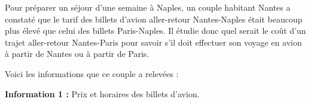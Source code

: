 
\medskip 

Pour préparer un séjour d'une semaine à Naples, un couple habitant Nantes a constaté que le tarif des billets d'avion aller-retour Nantes-Naples était beaucoup plus élevé que celui des billets Paris-Naples. Il étudie donc quel serait le coût d'un trajet aller-retour Nantes-Paris pour savoir s'il doit effectuer son voyage en 
avion à partir de Nantes ou à partir de Paris.
 
Voici les informations que ce couple a relevées :

\medskip
 
\textbf{Information 1 :}  Prix et horaires des billets d'avion.

\medskip


